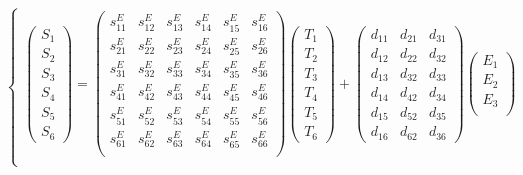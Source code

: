 \documentclass[dvipdfmx,12pt,a4paper]{jreport}
\begin{document}
			\begin{equation}
				\begin{cases}
				\left(
				\begin{array}{c}
					S_1 \\
					S_2 \\
					S_3 \\
					S_4 \\
					S_5 \\
					S_6 
				\end{array}
				\right)=\left(
				\begin{array}{cccccc}
				s^E_{11} & s^E_{12} & s^E_{13} & s^E_{14} & s^E_{15} & s^E_{16} \\
				s^E_{21} & s^E_{22} & s^E_{23} & s^E_{24} & s^E_{25} & s^E_{26} \\
				s^E_{31} & s^E_{32} & s^E_{33} & s^E_{34} & s^E_{35} & s^E_{36} \\
				s^E_{41} & s^E_{42} & s^E_{43} & s^E_{44} & s^E_{45} & s^E_{46} \\
				s^E_{51} & s^E_{52} & s^E_{53} & s^E_{54} & s^E_{55} & s^E_{56} \\
				s^E_{61} & s^E_{62} & s^E_{63} & s^E_{64} & s^E_{65} & s^E_{66} \\
				\end{array}
				\right)
				\left(
				\begin{array}{c}
					T_1 \\
					T_2 \\
					T_3 \\
					T_4 \\
					T_5 \\
					T_6 
				\end{array}
				\right)+
				\left(
				\begin{array}{ccc}
					d_{11} & d_{21}	& d_{31} \\
					d_{12} & d_{22}	& d_{32} \\
					d_{13} & d_{32}	& d_{33} \\
					d_{14} & d_{42} & d_{34} \\
					d_{15} & d_{52} & d_{35} \\
					d_{16} & d_{62}	& d_{36}
				\end{array}
				\right)
				\left(
				\begin{array}{c}
					E_1 \\
					E_2 \\
					E_3 \\
				\end{array}
				\right) & \\

\end{cases}
\end{equation}
\end{document}
